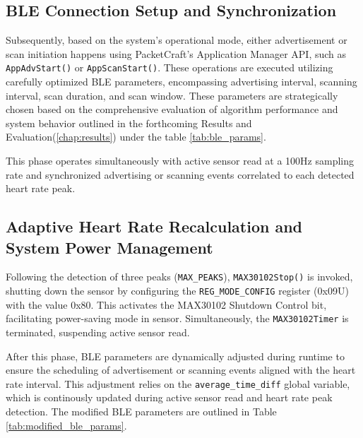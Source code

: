 \subsection{BLE Connection Setup and Synchronization}
Subsequently, based on the system's operational mode, either advertisement or scan initiation happens using PacketCraft's Application Manager API, such as \texttt{AppAdvStart()} or \texttt{AppScanStart()}. These operations are executed utilizing carefully optimized BLE parameters, encompassing advertising interval, scanning interval, scan duration, and scan window. These parameters are strategically chosen based on the comprehensive evaluation of algorithm performance and system behavior outlined in the forthcoming Results and Evaluation(\autoref{chap:results}) under the table \ref{tab:ble_params}. 

\noindent This phase operates simultaneously with active sensor read at a 100Hz sampling rate and synchronized advertising or scanning events correlated to each detected heart rate peak.

\subsection{Adaptive Heart Rate Recalculation and System Power Management}
Following the detection of three peaks (\texttt{MAX\_PEAKS}), \texttt{MAX30102Stop()} is invoked, shutting down the sensor by configuring the \texttt{REG\_MODE\_CONFIG} register (0x09U) with the value 0x80. This activates the MAX30102 Shutdown Control bit, facilitating power-saving mode in sensor. Simultaneously, the \texttt{MAX30102Timer} is terminated, suspending active sensor read.

\noindent After this phase, BLE parameters are dynamically adjusted during runtime to ensure the scheduling of advertisement or scanning events aligned with the heart rate interval. This adjustment relies on the \texttt{average\_time\_diff} global variable, which is continously updated during active sensor read and heart rate peak detection. The modified BLE parameters are outlined in Table \ref{tab:modified_ble_params}.

